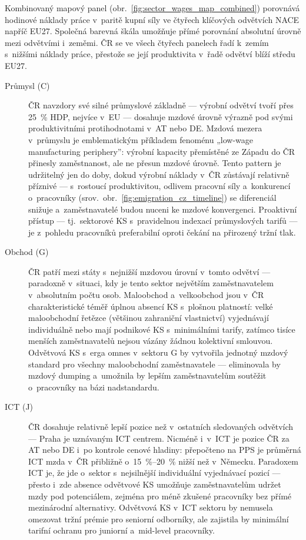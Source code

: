 
Kombinovaný mapový panel (obr.~\ref{fig:sector_wages_map_combined}) porovnává hodinové náklady práce v~paritě kupní síly ve čtyřech klíčových odvětvích \ac{NACE} napříč EU27.
Společná barevná škála umožňuje přímé porovnání absolutní úrovně mezi odvětvími i~zeměmi.
ČR se ve všech čtyřech panelech řadí k~zemím s~nižšími náklady práce, přestože se její produktivita v~řadě odvětví blíží středu EU27.

\begin{description}
  \item[Průmysl (C)]
    ČR navzdory své silné průmyslové základně --- výrobní odvětví tvoří přes \SI{25}{\percent} \ac{HDP}, nejvíce v~\ac{EU} --- dosahuje mzdové úrovně výrazně pod svými produktivitními protihodnotami v~AT nebo DE.
    Mzdová mezera v~průmyslu je emblematickým příkladem fenoménu „low-wage manufacturing periphery”: výrobní kapacity přemístěné ze Západu do ČR přinesly zaměstnanost, ale ne přesun mzdové úrovně.
    Tento pattern je udržitelný jen do doby, dokud výrobní náklady v~ČR zůstávají relativně příznivé --- s~rostoucí produktivitou, odlivem pracovní síly a~konkurencí o~pracovníky (srov.~obr.~\ref{fig:emigration_cz_timeline}) se diferenciál snižuje a~zaměstnavatelé budou nuceni ke mzdové konvergenci.
    Proaktivní přístup --- tj.~sektorové \ac{KS} s~pravidelnou indexací průmyslových tarifů --- je z~pohledu pracovníků preferabilní oproti čekání na přirozený tržní tlak.

  \item[Obchod (G)]
    ČR patří mezi státy s~nejnižší mzdovou úrovní v~tomto odvětví --- paradoxně v~situaci, kdy je tento sektor největším zaměstnavatelem v~absolutním počtu osob.
    Maloobchod a~velkoobchod jsou v~ČR charakteristické téměř úplnou absencí \ac{KS} s~plošnou platností: velké maloobchodní řetězce (většinou zahraniční vlastnictví) vyjednávají individuálně nebo mají podnikové \ac{KS} s~minimálními tarify, zatímco tisíce menších zaměstnavatelů nejsou vázány žádnou kolektivní smlouvou.
    Odvětvová \ac{KS} s~erga omnes v~sektoru G by vytvořila jednotný mzdový standard pro všechny maloobchodní zaměstnavatele --- eliminovala by mzdový dumping a~umožnila by lepším zaměstnavatelům soutěžit o~pracovníky na bázi nadstandardu.

  \item[ICT (J)]
    ČR dosahuje relativně lepší pozice než v~ostatních sledovaných odvětvích --- Praha je uznávaným ICT centrem.
    Nicméně i~v~ICT je pozice ČR za AT nebo DE i~po kontrole cenové hladiny: přepočteno na \ac{PPS} je průměrná ICT mzda v~ČR přibližně o~\SIrange{15}{20}{\percent} nižší než v~Německu.
    Paradoxem ICT je, že jde o~sektor s~nejsilnější individuální vyjednávací pozicí --- přesto i~zde absence odvětvové \ac{KS} umožňuje zaměstnavatelům udržet mzdy pod potenciálem, zejména pro méně zkušené pracovníky bez přímé mezinárodní alternativy.
    Odvětvová \ac{KS} v~ICT sektoru by nemusela omezovat tržní prémie pro seniorní odborníky, ale zajistila by minimální tarifní ochranu pro juniorní a~mid-level pracovníky.


\end{description}
